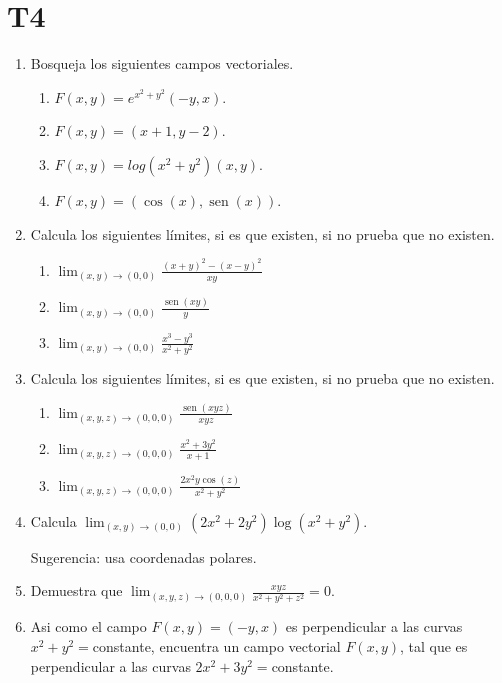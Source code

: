 \documentclass{article}
\theoremstyle{definition}
\newcommand{\sen}{\operatorname{sen}}
\begin{document}
  \section*{T4}
  
  
  
  \begin{enumerate}

	\item Bosqueja los siguientes campos vectoriales.

	
	\begin{enumerate}
	\item $F(x,y)=e^{x^2+y^2}(-y,x)$.
	\item $F(x,y)=(x+1,y-2)$.
	\item $F(x,y)=log(x^2+y^2)(x,y)$.
	\item $F(x,y)=(\cos(x),\sen(x))$.
	\end{enumerate}


  \item Calcula los siguientes l\'imites, si es que existen, si no prueba que no existen.
  
  \begin{enumerate}
  \item $\lim_{(x,y)\to (0,0)} \frac{(x+y)^2-(x-y)^2}{xy}$
  \item $\lim_{(x,y)\to (0,0)} \frac{\sen(xy)}{y}$
  \item $\lim_{(x,y)\to (0,0)} \frac{x^3-y^3}{x^2+y^2}$
  \end{enumerate}
  
  \item Calcula los siguientes l\'imites, si es que existen, si no prueba que no existen.


	\begin{enumerate}
	\item $\lim_{(x,y,z)\to (0,0,0)}\frac{\sen(xyz)}{xyz}$
	\item $\lim_{(x,y,z) \to (0,0,0)} \frac{x^2+3y^2}{x+1}$
	\item $\lim_{(x,y,z)\to (0,0,0)} \frac{2x^2y\cos(z)}{x^2+y^2}$
\end{enumerate}	  
  
  
  \item Calcula $\lim_{(x,y)\to (0,0)} (2x^2+2y^2)\log(x^2+y^2)$.
  
  Sugerencia: usa coordenadas polares.

  \item Demuestra que $\lim_{(x,y,z)\to (0,0,0)}\frac{xyz}{x^2+y^2+z^2}=0$.

\item Asi como el campo $F(x,y)=(-y,x)$ es perpendicular a las curvas $x^2+y^2=$constante, encuentra un campo vectorial $F(x,y)$, tal que es perpendicular a las curvas $2x^2+3y^2=$constante.



\end{enumerate}
\end{document}
